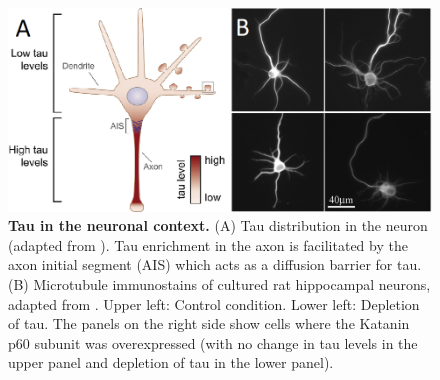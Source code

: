 \begin{figure}[h!tb]
	\centering
	\includegraphics[width=\linewidth]{Figures/neuron.png}
	\caption[Tau in the neuronal context.]{\textbf{Tau in the neuronal context.}
	(A) Tau distribution in the neuron (adapted from \cite{Ittner2018}). Tau enrichment in the axon is facilitated by the axon initial segment (AIS) which acts as a diffusion barrier for tau. (B) Microtubule immunostains of cultured rat hippocampal neurons, adapted from \cite{Qiang2006}. Upper left: Control condition. Lower left: Depletion of tau. The panels on the right side show cells where the Katanin p60 subunit was overexpressed (with no change in tau levels in the upper panel and depletion of tau in the lower panel).
		}\label{neuron}
\end{figure}

